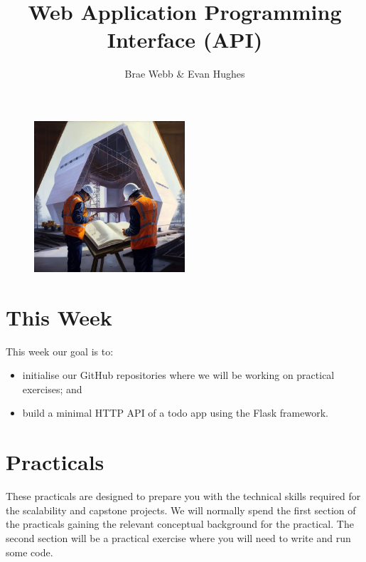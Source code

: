 \documentclass{csse4400}
\title{Web Application Programming Interface (API)}
\author{Brae Webb \& Evan Hughes}
\date{\week[practical]{1}}
\begin{document}
\maketitle

\begin{figure}[h]
    \centering
    \includegraphics[width=0.5\textwidth]{images/header}
\end{figure}



\section{This Week}
This week our goal is to:
\begin{itemize}
  \item initialise our GitHub repositories where we will be working on practical exercises; and
  \item build a minimal HTTP API of a todo app using the Flask framework.
\end{itemize}

\section{Practicals}
These practicals are designed to prepare you with the technical skills required for the scalability and capstone projects.
We will normally spend the first section of the practicals gaining the relevant conceptual background for the practical.
The second section will be a practical exercise where you will need to write and run some code.
\end{document}
